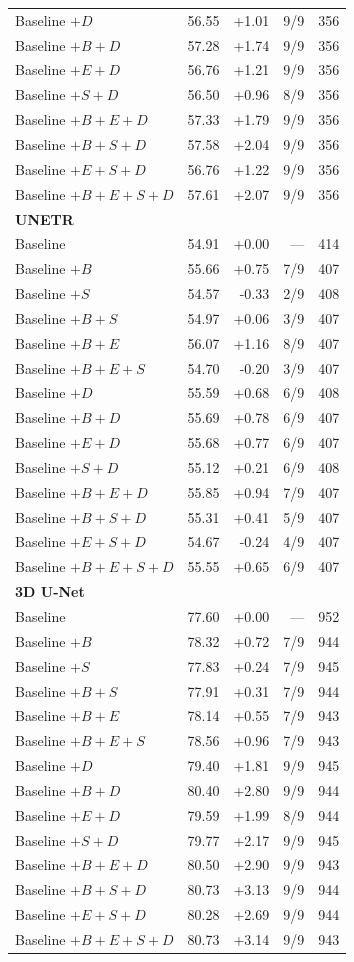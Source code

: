 \begin{longtable}{@{}lrrrr@{}}
Baseline $+D$ & 56.55 & +1.01 & 9/9 & 356 \\
Baseline $+B+D$ & 57.28 & +1.74 & 9/9 & 356 \\
Baseline $+E+D$ & 56.76 & +1.21 & 9/9 & 356 \\
Baseline $+S+D$ & 56.50 & +0.96 & 8/9 & 356 \\
Baseline $+B+E+D$ & 57.33 & +1.79 & 9/9 & 356 \\
Baseline $+B+S+D$ & 57.58 & +2.04 & 9/9 & 356 \\
Baseline $+E+S+D$ & 56.76 & +1.22 & 9/9 & 356 \\
Baseline $+B+E+S+D$ & 57.61 & +2.07 & 9/9 & 356 \\
\multicolumn{5}{l}{\textbf{UNETR}}\\[.3em]
Baseline & 54.91 & +0.00 & --- & 414 \\
Baseline $+B$ & 55.66 & +0.75 & 7/9 & 407 \\
Baseline $+S$ & 54.57 & -0.33 & 2/9 & 408 \\
Baseline $+B+S$ & 54.97 & +0.06 & 3/9 & 407 \\
Baseline $+B+E$ & 56.07 & +1.16 & 8/9 & 407 \\
Baseline $+B+E+S$ & 54.70 & -0.20 & 3/9 & 407 \\
Baseline $+D$ & 55.59 & +0.68 & 6/9 & 408 \\
Baseline $+B+D$ & 55.69 & +0.78 & 6/9 & 407 \\
Baseline $+E+D$ & 55.68 & +0.77 & 6/9 & 407 \\
Baseline $+S+D$ & 55.12 & +0.21 & 6/9 & 408 \\
Baseline $+B+E+D$ & 55.85 & +0.94 & 7/9 & 407 \\
Baseline $+B+S+D$ & 55.31 & +0.41 & 5/9 & 407 \\
Baseline $+E+S+D$ & 54.67 & -0.24 & 4/9 & 407 \\
Baseline $+B+E+S+D$ & 55.55 & +0.65 & 6/9 & 407 \\
\multicolumn{5}{l}{\textbf{3D U-Net}}\\[.3em]
Baseline & 77.60 & +0.00 & --- & 952 \\
Baseline $+B$ & 78.32 & +0.72 & 7/9 & 944 \\
Baseline $+S$ & 77.83 & +0.24 & 7/9 & 945 \\
Baseline $+B+S$ & 77.91 & +0.31 & 7/9 & 944 \\
Baseline $+B+E$ & 78.14 & +0.55 & 7/9 & 943 \\
Baseline $+B+E+S$ & 78.56 & +0.96 & 7/9 & 943 \\
Baseline $+D$ & 79.40 & +1.81 & 9/9 & 945 \\
Baseline $+B+D$ & 80.40 & +2.80 & 9/9 & 944 \\
Baseline $+E+D$ & 79.59 & +1.99 & 8/9 & 944 \\
Baseline $+S+D$ & 79.77 & +2.17 & 9/9 & 945 \\
Baseline $+B+E+D$ & 80.50 & +2.90 & 9/9 & 943 \\
Baseline $+B+S+D$ & 80.73 & +3.13 & 9/9 & 944 \\
Baseline $+E+S+D$ & 80.28 & +2.69 & 9/9 & 944 \\
Baseline $+B+E+S+D$ & 80.73 & +3.14 & 9/9 & 943 \\
\end{longtable}
